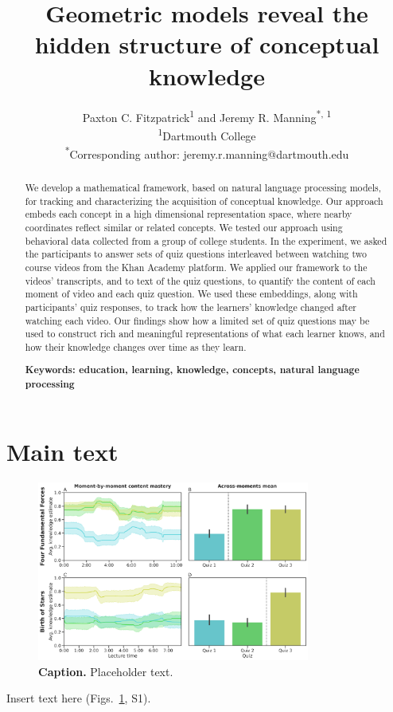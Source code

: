 \documentclass[10pt]{article}
\title{Geometric models reveal the hidden structure of conceptual knowledge}
\author{Paxton C. Fitzpatrick\textsuperscript{1} and Jeremy R.
Manning\textsuperscript{*, 1}\\\textsuperscript{1}Dartmouth
College\\\textsuperscript{*}Corresponding author:
jeremy.r.manning@dartmouth.edu}
\date{}
\newcommand{\demo}{S1}
\begin{document}
\maketitle

\begin{abstract} We develop a mathematical framework, based on natural language
processing models, for tracking and characterizing the acquisition of
conceptual knowledge. Our approach embeds each concept in a high dimensional
representation space, where nearby coordinates reflect similar or related
concepts. We tested our approach using behavioral data collected from a group
of college students. In the experiment, we asked the participants to answer
sets of quiz questions interleaved between watching two course videos from the
Khan Academy platform. We applied our framework to the videos' transcripts, and
to text of the quiz questions, to quantify the content of each moment of video
and each quiz question. We used these embeddings, along with participants' quiz
responses, to track how the learners' knowledge changed after watching each
video. Our findings show how a limited set of quiz questions may be used to
construct rich and meaningful representations of what each learner knows, and
how their knowledge changes over time as they learn.

\textbf{Keywords: education, learning, knowledge, concepts, natural language processing}

\end{abstract}


\section*{Main text}

\begin{figure}[tp]
\centering
\includegraphics[width=0.8\textwidth]{figs/content-mastery}
\caption{\textbf{Caption.} Placeholder text.}
\label{fig:demo}
\end{figure}

Insert text here (Figs.~\ref{fig:demo}, \demo).



\end{document}
